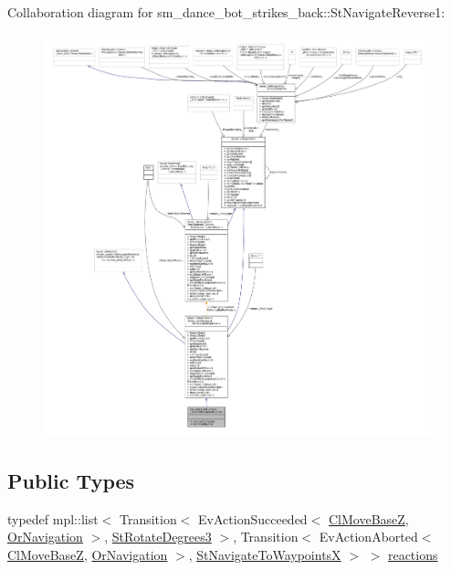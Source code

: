 Collaboration diagram for sm\+\_\+dance\+\_\+bot\+\_\+strikes\+\_\+back\+:\+:St\+Navigate\+Reverse1\+:
\nopagebreak
\begin{figure}[H]
\begin{center}
\leavevmode
\includegraphics[width=350pt]{structsm__dance__bot__strikes__back_1_1StNavigateReverse1__coll__graph}
\end{center}
\end{figure}
\subsection*{Public Types}
\begin{DoxyCompactItemize}
\item 
typedef mpl\+::list$<$ Transition$<$ Ev\+Action\+Succeeded$<$ \hyperlink{classmove__base__z__client_1_1ClMoveBaseZ}{Cl\+Move\+BaseZ}, \hyperlink{classsm__dance__bot__strikes__back_1_1OrNavigation}{Or\+Navigation} $>$, \hyperlink{structsm__dance__bot__strikes__back_1_1StRotateDegrees3}{St\+Rotate\+Degrees3} $>$, Transition$<$ Ev\+Action\+Aborted$<$ \hyperlink{classmove__base__z__client_1_1ClMoveBaseZ}{Cl\+Move\+BaseZ}, \hyperlink{classsm__dance__bot__strikes__back_1_1OrNavigation}{Or\+Navigation} $>$, \hyperlink{structsm__dance__bot__strikes__back_1_1StNavigateToWaypointsX}{St\+Navigate\+To\+WaypointsX} $>$ $>$ \hyperlink{structsm__dance__bot__strikes__back_1_1StNavigateReverse1_a7afa44efa60577fcd041292001a09d9f}{reactions}
\end{DoxyCompactItemize}
